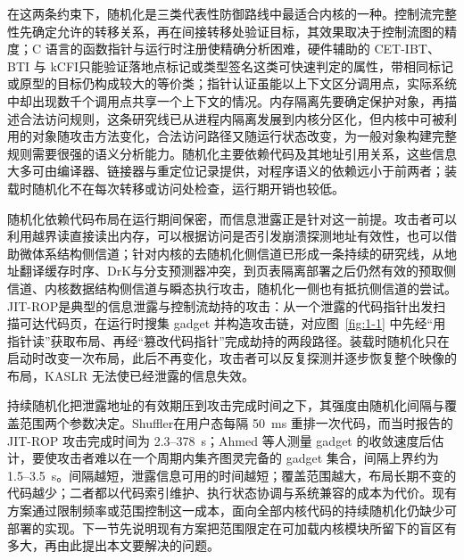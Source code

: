 在这两条约束下，随机化是三类代表性防御路线中最适合内核的一种。控制流完整性先确定允许的转移关系，再在间接转移处验证目标，其效果取决于控制流图的精度\citep{abadi2005cfi}；C 语言的函数指针与运行时注册使精确分析困难，硬件辅助的 CET-IBT、BTI 与 kCFI\citep{shanbhogue2019cet,arm2023armv8,clang2022kcfi}只能验证落地点标记或类型签名这类可快速判定的属性，带相同标记或原型的目标仍构成较大的等价类\citep{gaidis2023fineibt,burow2017cfi}；指针认证虽能以上下文区分调用点，实际系统中却出现数千个调用点共享一个上下文的情况\citep{liljestrand2019pac}。内存隔离先要确定保护对象，再描述合法访问规则，这条研究线已从进程内隔离发展到内核分区化\citep{vahldiek2019erim,hedayati2019hodor,dautenhahn2015nested,huang2022ksplit,guo2025bulkhead,lefeuvre2025sok}，但内核中可被利用的对象随攻击方法变化，合法访问路径又随运行状态改变，为一般对象构建完整规则需要很强的语义分析能力。随机化主要依赖代码及其地址引用关系，这些信息大多可由编译器、链接器与重定位记录提供，对程序语义的依赖远小于前两者；装载时随机化不在每次转移或访问处检查，运行期开销也较低。

随机化依赖代码布局在运行期间保密，而信息泄露正是针对这一前提。攻击者可以利用越界读直接读出内存，可以根据访问是否引发崩溃探测地址有效性，也可以借助微体系结构侧信道；针对内核的去随机化侧信道已形成一条持续的研究线，从地址翻译缓存时序\citep{hund2013practical}、DrK\citep{jang2016drk}与分支预测器冲突\citep{evtyushkin2016jump}，到页表隔离部署之后仍然有效的预取侧信道\citep{liu2023entrybleed,lipp2022amd}、内核数据结构侧信道\citep{maar2025kernelsnitch}与瞬态执行攻击\citep{canella2019transient}，随机化一侧也有抵抗侧信道的尝试\citep{gens2017lazarus}。JIT-ROP\citep{snow2013just}是典型的信息泄露与控制流劫持的攻击：从一个泄露的代码指针出发扫描可达代码页，在运行时搜集 gadget 并构造攻击链，对应图~\ref{fig:1-1} 中先经“用指针读”获取布局、再经“篡改代码指针”完成劫持的两段路径。装载时随机化只在启动时改变一次布局，此后不再变化，攻击者可以反复探测并逐步恢复整个映像的布局，KASLR 无法使已经泄露的信息失效。

持续随机化把泄露地址的有效期压到攻击完成时间之下，其强度由随机化间隔与覆盖范围两个参数决定。Shuffler\citep{williams2016shuffler}在用户态每隔 50~ms 重排一次代码，而当时报告的 JIT-ROP 攻击完成时间为 2.3--378~s；Ahmed 等人\citep{ahmed2020methodologies}测量 gadget 的收敛速度后估计，要使攻击者难以在一个周期内集齐图灵完备的 gadget 集合，间隔上界约为 1.5--3.5~s。间隔越短，泄露信息可用的时间越短；覆盖范围越大，布局长期不变的代码越少；二者都以代码索引维护、执行状态协调与系统兼容的成本为代价。现有方案通过限制频率或范围控制这一成本，面向全部内核代码的持续随机化仍缺少可部署的实现。下一节先说明现有方案把范围限定在可加载内核模块所留下的盲区有多大，再由此提出本文要解决的问题。


